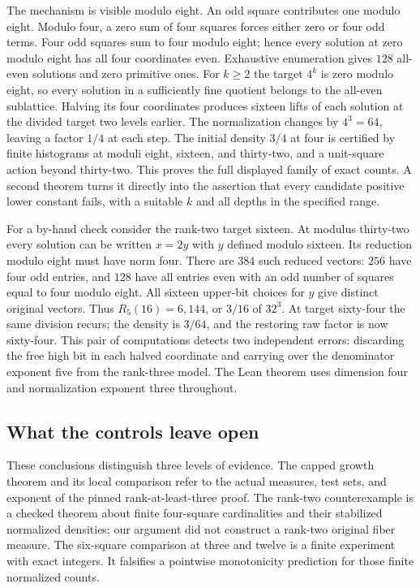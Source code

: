 \documentclass[12pt,letterpaper]{article}
\begin{document}
The mechanism is visible modulo eight. An odd square contributes one modulo eight. Modulo four, a zero sum of four squares forces either zero or four odd terms. Four odd squares sum to four modulo eight; hence every solution at zero modulo eight has all four coordinates even. Exhaustive enumeration gives $128$ all-even solutions and zero primitive ones. For $k\geq2$ the target $4^k$ is zero modulo eight, so every solution in a sufficiently fine quotient belongs to the all-even sublattice. Halving its four coordinates produces sixteen lifts of each solution at the divided target two levels earlier. The normalization changes by $4^3=64$, leaving a factor $1/4$ at each step. The initial density $3/4$ at four is certified by finite histograms at moduli eight, sixteen, and thirty-two, and a unit-square action beyond thirty-two. This proves the full displayed family of exact counts. A second theorem turns it directly into the assertion that every candidate positive lower constant fails, with a suitable $k$ and all depths in the specified range.

For a by-hand check consider the rank-two target sixteen. At modulus thirty-two every solution can be written $x=2y$ with $y$ defined modulo sixteen. Its reduction modulo eight must have norm four. There are $384$ such reduced vectors: $256$ have four odd entries, and $128$ have all entries even with an odd number of squares equal to four modulo eight. All sixteen upper-bit choices for $y$ give distinct original vectors. Thus $R_5(16)=6{,}144$, or $3/16$ of $32^3$. At target sixty-four the same division recurs; the density is $3/64$, and the restoring raw factor is now sixty-four. This pair of computations detects two independent errors: discarding the free high bit in each halved coordinate and carrying over the denominator exponent five from the rank-three model. The Lean theorem uses dimension four and normalization exponent three throughout.

\subsection{What the controls leave open}
These conclusions distinguish three levels of evidence. The capped growth theorem and its local comparison refer to the actual measures, test sets, and exponent of the pinned rank-at-least-three proof. The rank-two counterexample is a checked theorem about finite four-square cardinalities and their stabilized normalized densities; our argument did not construct a rank-two original fiber measure. The six-square comparison at three and twelve is a finite experiment with exact integers. It falsifies a pointwise monotonicity prediction for those finite normalized counts.
\end{document}
